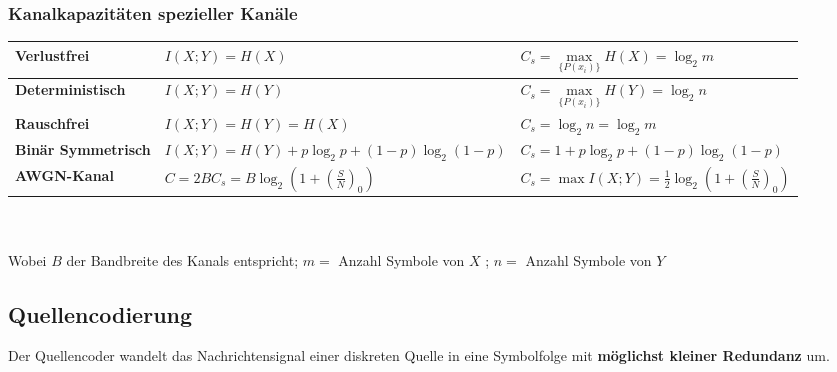 \subsubsection{Kanalkapazitäten spezieller Kanäle}

	\renewcommand{\arraystretch}{2}
	\begin{tabular}{| p{3.5cm} | p{7.5cm} | p{6.5cm} |}
		\hline  
    		\textbf{Verlustfrei}
    			& $ I(X; Y) = H(X) $
    			& $ C_s = \max\limits_{\{ P(x_i) \}}{H (X)} = \log_2 m $ \\
		\hline
    		\textbf{Deterministisch}
    			& $ I(X; Y) = H(Y) $
    			& $ C_s = \max\limits_{\{ P(x_i) \}}{H (Y)} = \log_2 n $ \\
		\hline
    		\textbf{Rauschfrei}
    			& $ I(X; Y) = H(Y) = H(X)$
    			& $ C_s = \log_2 n = \log_2 m$ \\
		\hline
    		\textbf{Binär Symmetrisch}
    			& $ I(X; Y) = H(Y) + p \log_2 p + (1-p) \log_2 (1-p)$
    			& $ C_s = 1 + p \log_2 p + (1-p) \log_2 (1-p)$ \\
		\hline
    		\textbf{AWGN-Kanal}
    			& $ C = 2 B C_s = B \log_2 (1 + \left(\frac{S}{N}\right)_0)$ 
    			& $ C_s = \max{I(X; Y) = \frac{1}{2} \log_2 (1 + \left(\frac{S}{N}\right)_0)}$ \\
		\hline
 	\end{tabular}
	\renewcommand{\arraystretch}{1} \\ \\
Wobei $B$ der Bandbreite des Kanals entspricht; $ m =$ Anzahl Symbole von $X$ ; $n=$ Anzahl Symbole von $Y$

\subsection{Quellencodierung }
 Der Quellencoder wandelt das Nachrichtensignal einer diskreten Quelle in eine Symbolfolge mit \textbf{möglichst kleiner Redundanz} um.

